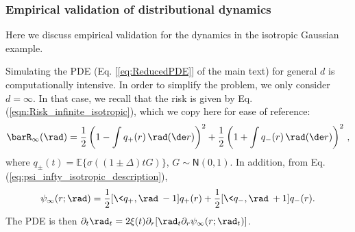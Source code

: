 \documentclass[11pt]{article}
\begin{document}
\subsubsection{Empirical validation of distributional dynamics}\label{subsubsec:num_isotropic_dyna}
Here we discuss empirical validation for the dynamics in the isotropic Gaussian example.

 Simulating the PDE (Eq. [\ref{eq:ReducedPDE}] of the main text) for general $d$ is computationally intensive. 
In order to simplify the problem, we only consider $d=\infty$. In that case, we recall that the risk is given by Eq. (\ref{eqn:Risk_infinite_isotropic}), which we copy here for ease of reference:
\begin{align}
%
\barR_{\infty}(\rad)= \frac{1}{2}\left(1-\int q_+(r)\, \rad(\de r)\right)^2+\frac{1}{2}\left(1+\int q_-(r)\, \rad(\de r)\right)^2\, ,
%
\end{align}
where $q_\pm(t) = \mathbb{E}\{\sigma((1\pm \Delta)tG)\}$, $G\sim\mathsf{N}(0,1)$. In addition, from Eq. (\ref{eq:psi_infty_isotropic_description}),
\begin{align}
\psi_\infty(r; \rad) = \frac{1}{2} [ \< q_+, \rad\> - 1 ] q_+(r) + \frac{1}{2} [ \< q_-, \rad\> + 1 ] q_-(r).
\end{align}
The PDE is then $\partial_t \rad_t = 2\xi(t) \partial_r [\rad_t \partial_r \psi_\infty(r; \rad_t)]$.
\end{document}
